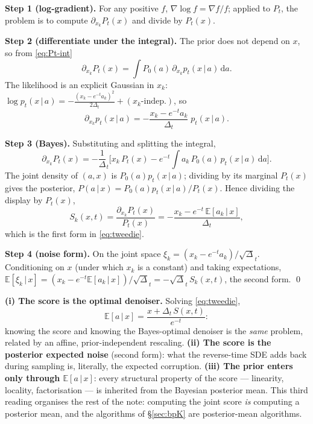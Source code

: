 \documentclass[11pt]{article}
\theoremstyle{definition}
\newcommand{\E}{\mathbb{E}}
\newcommand{\Dt}{\Delta_t}
\newcommand{\given}{\,|\,}
\newcommand{\dd}{\mathrm{d}}
\begin{document}
\begin{derivation}
\textbf{Step 1 (log-gradient).} For any positive $f$,
$\nabla\log f=\nabla f/f$; applied to $P_t$, the problem is to compute
$\partial_{x_k}P_t(x)$ and divide by $P_t(x)$.

\textbf{Step 2 (differentiate under the integral).} The prior does not depend
on $x$, so from \eqref{eq:Pt-int}
\[
  \partial_{x_k}P_t(x)=\int P_0(a)\,\partial_{x_k}p_t(x\given a)\,\dd a .
\]
The likelihood is an explicit Gaussian in $x_k$:
$\log p_t(x\given a)=-\frac{(x_k-e^{-t}a_k)^2}{2\Dt}+(\text{$x_k$-indep.})$,
so
\[
  \partial_{x_k}p_t(x\given a)
  =-\frac{x_k-e^{-t}a_k}{\Dt}\;p_t(x\given a).
\]

\textbf{Step 3 (Bayes).} Substituting and splitting the integral,
\[
  \partial_{x_k}P_t(x)
  =-\frac1\Dt\Big[x_k\,P_t(x)-e^{-t}\!\int a_k\,P_0(a)\,p_t(x\given a)\,\dd a\Big].
\]
The joint density of $(a,x)$ is $P_0(a)p_t(x\given a)$; dividing by its
marginal $P_t(x)$ gives the posterior, $P(a\given
x)=P_0(a)p_t(x\given a)/P_t(x)$. Hence dividing the display by $P_t(x)$,
\[
  S_k(x,t)=\frac{\partial_{x_k}P_t(x)}{P_t(x)}
  =-\frac{x_k-e^{-t}\,\E[a_k\given x]}{\Dt},
\]
which is the first form in \eqref{eq:tweedie}.

\textbf{Step 4 (noise form).} On the joint space
$\xi_k=(x_k-e^{-t}a_k)/\sqrt\Dt$. Conditioning on $x$ (under which $x_k$ is a
constant) and taking expectations,
$\E[\xi_k\given x]=(x_k-e^{-t}\E[a_k\given x])/\sqrt\Dt
=-\sqrt\Dt\,S_k(x,t)$, the second form. \qed
\end{derivation}

\begin{bayesianview}
\textbf{(i) The score is the optimal denoiser.} Solving \eqref{eq:tweedie},
\[
  \E[a\given x]=\frac{x+\Dt\,S(x,t)}{e^{-t}} :
\]
knowing the score and knowing the Bayes-optimal denoiser is the \emph{same}
problem, related by an affine, prior-independent rescaling. \textbf{(ii) The
score is the posterior expected noise} (second form): what the reverse-time
SDE adds back during sampling is, literally, the expected corruption.
\textbf{(iii) The prior enters only through $\E[a\given x]$}: every structural
property of the score --- linearity, locality, factorisation --- is inherited
from the Bayesian posterior mean. This third reading organises the rest of
the note: computing the joint score \emph{is} computing a posterior mean, and
the algorithms of \S\ref{sec:bpK} are posterior-mean algorithms.
\end{bayesianview}
\end{document}
